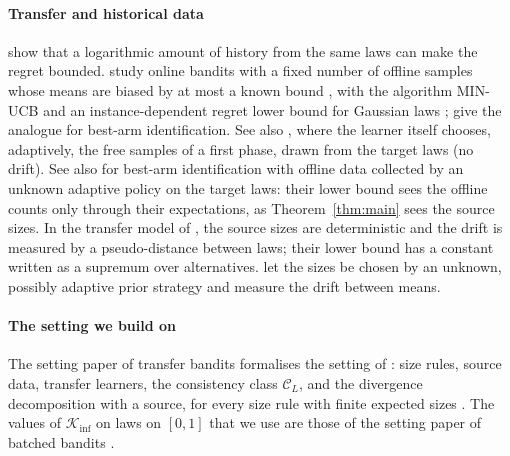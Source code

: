 \documentclass[11pt]{article}
\begin{document}
\paragraph{Transfer and historical data} \citet{SJ12} show that a logarithmic amount of history from
the same laws can make the regret bounded. \citet{CL24} study online bandits with a fixed number of
offline samples whose means are biased by at most a known bound \citep[(4)]{CL24}, with the
algorithm MIN-UCB and an instance-dependent regret lower bound for Gaussian laws
\citep[Theorem~3]{CL24}; \citet[Theorem~5.1]{YTC25} give the analogue for best-arm
identification. See also \citet{HZT26}, where the learner itself chooses, adaptively, the free
samples of a first phase, drawn from the target laws (no drift). See also \citet[Section~2]{AJSS23}
for best-arm identification with offline data collected by an unknown adaptive policy on the target
laws: their lower bound \citep[Theorem~2.1]{AJSS23} sees the offline counts only through their
expectations, as Theorem~\ref{thm:main} sees the source sizes. In the transfer
model of \citet{PMM25}, the source sizes are deterministic and the drift is measured by a
pseudo-distance between laws; their lower bound \citep[Theorem~3]{PMM25} has a constant written as a
supremum over alternatives. \citet{PMRM26} let the sizes be chosen by an unknown, possibly adaptive
prior strategy and measure the drift between means.

\paragraph{The setting we build on} The setting paper of transfer bandits \citep{INC-P003} formalises the setting of
\citet{PMRM26}: size rules, source data, transfer learners, the consistency class $\mathcal C_L$,
and the divergence decomposition with a source, for every size rule with finite expected sizes
\citep[Theorem~4.1, Corollary~4.2]{INC-P003}. The values of $\mathcal K_{\inf}$ on laws on $[0,1]$
that we use are those of the setting paper of batched bandits \citep[Proposition~4.2]{INC-P006}.
\end{document}
